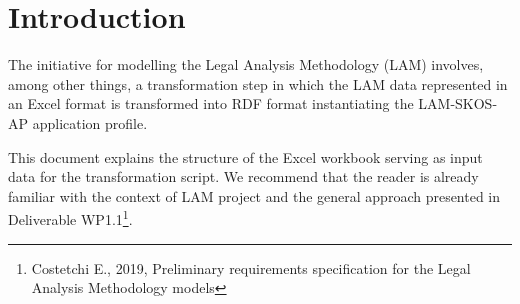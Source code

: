 \section{Introduction}\label{ariaid-title1}


The initiative for modelling the Legal Analysis Methodology (LAM) involves, among other things, a transformation step in which the LAM data represented in an Excel format is transformed into RDF format instantiating the LAM-SKOS-AP application profile.

This document explains the structure of the Excel workbook serving as input data for the transformation script. We recommend that the reader is already familiar with the context of LAM project and the general approach presented in Deliverable WP1.1\footnote{Costetchi E., 2019, Preliminary requirements specification for the Legal Analysis Methodology models}.
